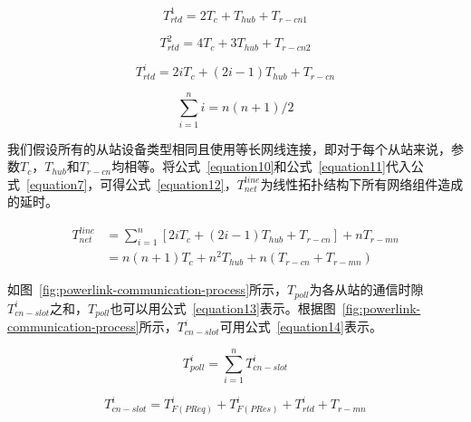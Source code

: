 \begin{equation}
\label{equation8}
T_{rtd}^{1}=2T_{c}+T_{hub}+T_{r-cn1}
\end{equation}

\begin{equation}
\label{equation9}
T_{rtd}^{2}=4T_{c}+3T_{hub}+T_{r-cn2}
\end{equation}

\begin{equation}
\label{equation10}
T_{rtd}^{i}=2iT_{c}+(2i-1)T_{hub}+T_{r-cn}
\end{equation}

\begin{equation}
\label{equation11}
\sum_{i=1}^ni=n(n+1)/2
\end{equation}

我们假设所有的从站设备类型相同且使用等长网线连接，即对于每个从站来说，参数$T_{c}$，$T_{hub}$和$T_{r-cn}$均相等。将公式~\ref{equation10}和公式~\ref{equation11}代入公式~\ref{equation7}，可得公式~\ref{equation12}，$T_{net}^{line}$为线性拓扑结构下所有网络组件造成的延时。

\begin{equation}
\begin{split}
\label{equation12}
T_{net}^{line}&=\sum_{i=1}^n[2iT_{c}+(2i-1)T_{hub}+T_{r-cn}]+nT_{r-mn}\\
&=n(n+1)T_{c}+n^2T_{hub}+n(T_{r-cn}+T_{r-mn})
\end{split}
\end{equation}

如图~\ref{fig:powerlink-communication-process}所示，$T_{poll}$为各从站的通信时隙$T_{cn-slot}^{i}$之和，$T_{poll}$也可以用公式~\ref{equation13}表示。根据图~\ref{fig:powerlink-communication-process}所示，$T_{cn-slot}^{i}$可用公式~\ref{equation14}表示。

\begin{equation}
\label{equation13}
T_{poll}^{i}=\sum_{i=1}^nT_{cn-slot}^{i}
\end{equation}

\begin{equation}
\label{equation14}
T_{cn-slot}^{i}=T_{F(PReq)}^{i}+T_{F(PRes)}^{i}+T_{rtd}^{i}+T_{r-mn}
\end{equation}


